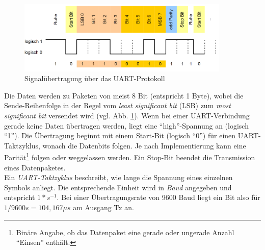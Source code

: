 \begin{figure}[H]
	\centering
   \includegraphics[width=0.90\textwidth]{bilder/uart}
	\caption{Signalübertragung über das UART-Protokoll}
	\label{fig:uart}
\end{figure}


Die Daten werden zu Paketen von meist 8 Bit (entspricht 1 Byte), wobei die Sende-Reihenfolge in der Regel vom \textit{least significant bit} (LSB) zum \textit{most significant bit} versendet wird (vgl. Abb. \ref{fig:uart}). Wenn bei einer UART-Verbindung gerade keine Daten übertragen werden, liegt eine ``high''-Spannung an (logisch ``1''). Die Übertragung beginnt mit einem Start-Bit (logisch ``0'') für einen UART-Taktzyklus, wonach die Datenbits folgen. Je nach Implementierung kann eine Parität\footnote{Binäre Angabe, ob das Datenpaket eine gerade oder ungerade Anzahl ``Einsen'' enthält.} folgen oder weggelassen werden. Ein Stop-Bit beendet die Transmission eines Datenpaketes. \\

Ein \textit{UART-Taktzyklus} beschreibt, wie lange die Spannung eines einzelnen Symbols anliegt. Die entsprechende Einheit wird in \textit{Baud} angegeben und entspricht $1 * s^{-1}$. Bei einer Übertragungsrate von 9600 Baud liegt ein Bit also für $1 / 9600s = 104,167 \mu s$ am Ausgang Tx an. \\


